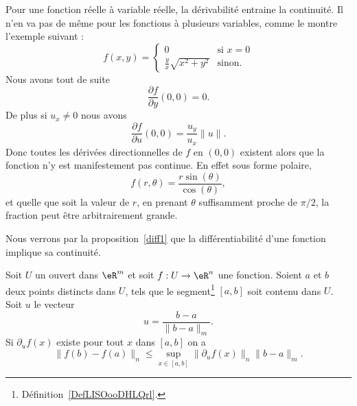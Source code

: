 \begin{example}
    Pour une fonction réelle à variable réelle, la dérivabilité entraine la continuité. Il n'en va pas de même pour les fonctions à plusieurs variables, comme le montre l'exemple suivant :
    \begin{equation}
        f(x,y)=\begin{cases}
            0    &   \text{si } x=0\\
            \frac{ y }{ x }\sqrt{x^2+y^2}    &    \text{sinon.}
        \end{cases}
    \end{equation}
    Nous avons tout de suite
    \begin{equation}
        \frac{ \partial f }{ \partial y }(0,0)=0.
    \end{equation}
    De plus si \( u_x\neq 0\) nous avons
    \begin{equation}
            \frac{ \partial f }{ \partial u }(0,0)=\frac{ u_y }{ u_x }\| u \|.
    \end{equation}
    Donc toutes les dérivées directionnelles de \( f\) en \( (0,0)\) existent alors que la fonction n'y est manifestement pas continue. En effet sous forme polaire,
    \begin{equation}
        f(r,\theta)=\frac{ r\sin(\theta) }{ \cos(\theta) },
    \end{equation}
    et quelle que soit la valeur de \( r\), en prenant \( \theta\) suffisamment proche de \( \pi/2\), la fraction peut être arbitrairement grande.

    Nous verrons par la proposition~\ref{diff1} que la différentiabilité d'une fonction implique sa continuité.
\end{example}

\begin{theorem}\label{val_medio_1}		
    Soit $U$ un ouvert dans $\eR^m$ et soit $f:U\to\eR^n$ une fonction. Soient $a$ et $b$ deux points distincts dans $U$, tels que le segment\footnote{Définition~\ref{DefLISOooDHLQrl}.} $[a,b]$ soit contenu dans $U$. Soit $u$ le vecteur
	\[
		u=\frac{b-a}{\|b-a\|_m}.
	\]
	Si $\partial_u f(x)$ existe pour tout $x$ dans $[a,b]$ on a
	\[
		\|f(b)-f(a)\|_n\leq \sup_{x\in[a,b]}\|\partial_uf(x)\|_n\|b-a\|_m.
	\]
\end{theorem}

